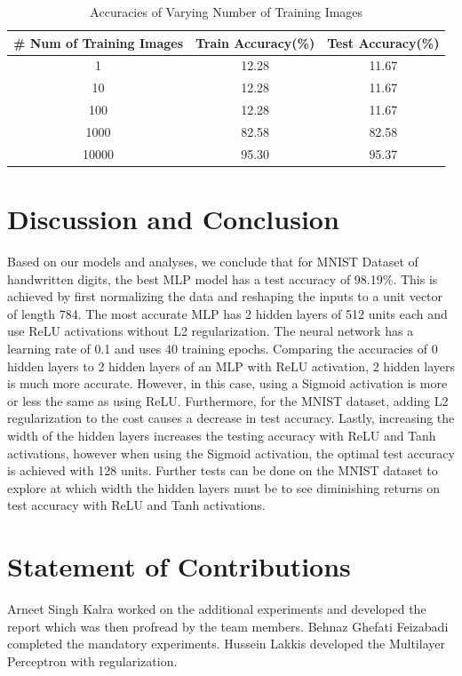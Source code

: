\documentclass[11pt]{homework}
\begin{document}
\begin{table}[h!] 
    \centering
    \begin{tabular}{||c c c||} 
    \hline
         # Num of Training Images & Train Accuracy(\%) & Test Accuracy(\%) \\ [0.5ex]
         \hline\hline
         1     & 12.28 & 11.67\\
         10    & 12.28 & 11.67\\
         100   & 12.28 & 11.67\\
         1000  & 82.58 & 82.58\\
         10000 & 95.30 & 95.37\\
         \hline
    \end{tabular}
    \caption{Accuracies of Varying Number of Training Images}
    \label{table-varying-set-size}
\end{table}


\section{Discussion and Conclusion}
Based on our models and analyses, we conclude that for MNIST Dataset of handwritten digits, the best MLP model has a test accuracy of 98.19\%. This is achieved by first normalizing the data and reshaping the inputs to a unit vector of length 784. The most accurate MLP has 2 hidden layers of 512 units each and use ReLU activations without L2 regularization. The neural network has a learning rate of 0.1 and uses 40 training epochs. Comparing the accuracies of 0 hidden layers to 2 hidden layers of an MLP with ReLU activation, 2 hidden layers is much more accurate. However, in this case, using a Sigmoid activation is more or less the same as using ReLU. Furthermore, for the MNIST dataset, adding L2 regularization to the cost causes a decrease in test accuracy. Lastly, increasing the width of the hidden layers increases the testing accuracy with ReLU and Tanh activations, however when using the Sigmoid activation, the optimal test accuracy is achieved with 128 units. Further tests can be done on the MNIST dataset to explore at which width the hidden layers must be to see diminishing returns on test accuracy with ReLU and Tanh activations. 

\section{Statement of Contributions}
Arneet Singh Kalra worked on the additional experiments and developed the report which was then profread by the team members. Behnaz Ghefati Feizabadi completed the mandatory experiments. Hussein Lakkis developed the Multilayer Perceptron with regularization. 

\printbibliography
\end{document}
